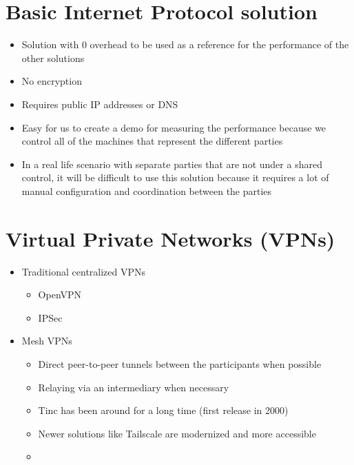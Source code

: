 \hypertarget{basic-internet-protocol-solution}{%
\section{Basic Internet Protocol
solution}\label{basic-internet-protocol-solution}}

\begin{itemize}
\tightlist
\item
  Solution with 0 overhead to be used as a reference for the performance
  of the other solutions
\item
  No encryption
\item
  Requires public IP addresses or DNS
\item
  Easy for us to create a demo for measuring the performance because we
  control all of the machines that represent the different parties
\item
  In a real life scenario with separate parties that are not under a
  shared control, it will be difficult to use this solution because it
  requires a lot of manual configuration and coordination between the
  parties
\end{itemize}

\hypertarget{virtual-private-networks-vpns}{%
\section{Virtual Private Networks
(VPNs)}\label{virtual-private-networks-vpns}}

\begin{itemize}
\tightlist
\item
  Traditional centralized VPNs

  \begin{itemize}
  \tightlist
  \item
    OpenVPN
  \item
    IPSec
  \end{itemize}
\item
  Mesh VPNs

  \begin{itemize}
  \tightlist
  \item
    Direct peer-to-peer tunnels between the participants when possible
  \item
    Relaying via an intermediary when necessary
  \item
    Tinc has been around for a long time (first release in 2000)
  \item
    Newer solutions like Tailscale are modernized and more accessible
  \item
  \end{itemize}
\end{itemize}

